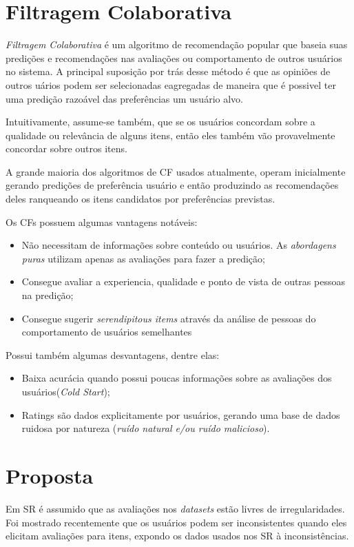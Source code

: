 \documentclass{sig-alternate}
\begin{document}
\section{Filtragem Colaborativa}
\emph{Filtragem Colaborativa} é um algoritmo de recomendação popular que baseia suas predições e
recomendações nas avaliações ou comportamento de outros usuários no sistema. A principal
suposição por trás desse método é que as opiniões de outros uários podem ser selecionadas eagregadas de maneira que é possivel ter uma predição razoável das preferências um usuário alvo.

Intuitivamente, assume-se também, que se os usuários concordam sobre a qualidade ou relevância de alguns itens, então eles também vão provavelmente concordar sobre outros itens.

A grande maioria dos algoritmos de CF usados atualmente, operam inicialmente gerando
predições de preferência usuário e então produzindo as recomendações deles ranqueando os
itens candidatos por preferências previstas.

Os CFs possuem algumas vantagens notáveis:
\begin{itemize}
	\item Não necessitam de informações sobre conteúdo ou usuários. As  \emph{abordagens puras} utilizam apenas as avaliações para fazer a predição;
	\item Consegue avaliar a experiencia, qualidade e ponto de vista de outras pessoas na predição;
	\item Consegue sugerir \emph{serendipitous items} através da análise de pessoas do comportamento de usuários semelhantes
\end{itemize}
Possui também algumas desvantagens, dentre elas:
\begin{itemize}
	\item Baixa acurácia quando possui poucas informações sobre as avaliações dos usuários(\emph{Cold Start});
	\item Ratings são dados explicitamente por usuários, gerando uma base de dados ruidosa por natureza (\emph{ruído natural e/ou ruído malicioso}).
\end{itemize}

\section{Proposta}
Em SR é assumido que as avaliações nos \emph{datasets} estão livres de irregularidades. Foi mostrado recentemente que os usuários podem ser inconsistentes quando eles elicitam avaliações para itens, expondo os dados usados nos SR à inconsistências.
\end{document}
